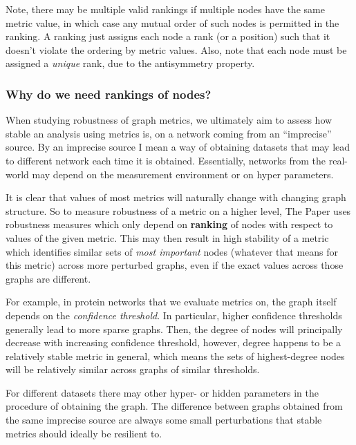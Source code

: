 Note, there may be multiple valid rankings if multiple nodes have the same metric value, in which case any mutual order of such nodes is permitted in the ranking.
A ranking just assigns each node a rank (or a position) such that it doesn't violate the ordering by metric values.
Also, note that each node must be assigned a \textsl{unique} rank, due to the antisymmetry property.




\subsubsection*{Why do we need rankings of nodes?}

When studying robustness of graph metrics, we ultimately aim to assess how stable an analysis using metrics is, on a network coming from an ``imprecise'' source.
By an imprecise source I mean a way of obtaining datasets that may lead to different network each time it is obtained.
Essentially, networks from the real-world may depend on the measurement environment or on hyper parameters.

It is clear that values of most metrics will naturally change with changing graph structure.
So to measure robustness of a metric on a higher level, The Paper uses robustness measures which only depend on \textbf{ranking} of nodes with respect to values of the given metric.
This may then result in high stability of a metric which identifies similar sets of \textsl{most important} nodes (whatever that means for this metric) across more perturbed graphs, even if the exact values across those graphs are different.

\parspace

For example, in protein networks that we evaluate metrics on, the graph itself depends on the \textsl{confidence threshold}.
In particular, higher confidence thresholds generally lead to more sparse graphs.
Then, the degree of nodes will principally decrease with increasing confidence threshold, however, degree happens to be a relatively stable metric in general, which means the sets of highest-degree nodes will be relatively similar across graphs of similar thresholds.

For different datasets there may other hyper- or hidden parameters in the procedure of obtaining the graph.
The difference between graphs obtained from the same imprecise source are always some small perturbations that stable metrics should ideally be resilient to.

